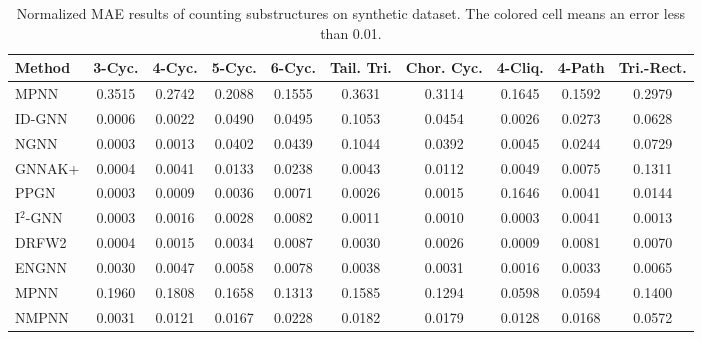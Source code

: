 \begin{table*}
\vskip -0.1in
\caption{Normalized MAE results of counting substructures on synthetic dataset. The colored cell means an error less than 0.01.}\label{tab::count} 
\vskip 0.1in
\centering
\begin{small}
\begin{tabular}{lccccccccc}
\toprule
Method& 3-Cyc. & 4-Cyc. & 5-Cyc. & 6-Cyc. & Tail. Tri. & Chor. Cyc. & 4-Cliq. & 4-Path & Tri.-Rect.     \\ \midrule
MPNN & 0.3515 & 0.2742   &  0.2088   & 0.1555& 0.3631 & 0.3114 & 0.1645 & 0.1592 & 0.2979 \\
ID-GNN  & {\color{yellow}0.0006} & {\color{yellow}0.0022} &0.0490 & 0.0495  & 0.1053 & 0.0454 &{\color{yellow}0.0026} & 0.0273 & 0.0628        \\
NGNN    &{\color{yellow}0.0003}  & 0.0013 & 0.0402 & 0.0439  &0.1044 & 0.0392&{\color{yellow}0.0045} & 0.0244 & 0.0729   \\
GNNAK+  &{\color{yellow}0.0004}&{\color{yellow}0.0041}  &0.0133  &0.0238 &{\color{yellow}0.0043}&0.0112&{\color{yellow}0.0049}&{\color{yellow}0.0075} &0.1311  \\
PPGN  &  {\color{yellow}0.0003}    &   {\color{yellow}0.0009}  &  {\color{yellow}0.0036} &  {\color{yellow}0.0071}  & {\color{yellow}0.0026} &{\color{yellow}0.0015} & 0.1646 &{\color{yellow}0.0041} & 0.0144\\
I$^2$-GNN  & {\color{yellow}0.0003}  &  {\color{yellow}0.0016}   & {\color{yellow}0.0028} &  {\color{yellow}0.0082}  &{\color{yellow}0.0011} &{\color{yellow}0.0010} &{\color{yellow}0.0003} &{\color{yellow}0.0041} &{\color{yellow}0.0013} \\
DRFW2  & {\color{yellow}0.0004} & {\color{yellow}0.0015} & {\color{yellow}0.0034} & {\color{yellow}0.0087}& {\color{yellow}0.0030} &{\color{yellow}0.0026} &{\color{yellow}0.0009} &{\color{yellow}0.0081} &{\color{yellow}0.0070} \\
\midrule
    ENGNN & {\color{yellow}0.0030} & {\color{yellow}0.0047} & {\color{yellow}0.0058} & {\color{yellow}0.0078} & {\color{yellow}0.0038} & {\color{yellow}0.0031} &{\color{yellow}0.0016}& {\color{yellow}0.0033} &{\color{yellow}0.0065}\\
MPNN & 0.1960 & 0.1808 & 0.1658 & 0.1313 & 0.1585 & 0.1294 & 0.0598 & 0.0594 & 0.1400\\
NMPNN & {\color{yellow}0.0031} & 0.0121 & 0.0167 & 0.0228 & 0.0182 & 0.0179 & 0.0128 & 0.0168 & 0.0572\\
\bottomrule
\end{tabular}
\end{small}
\label{exp_count_cycle}
\end{table*}

